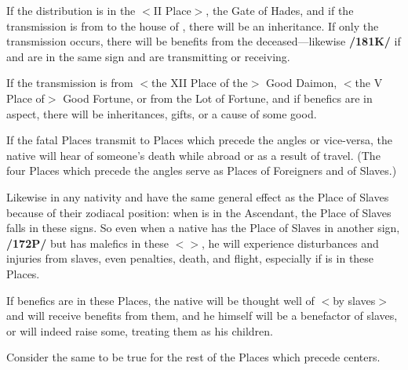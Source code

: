 If the distribution is in the $<$II Place$>$, the Gate of Hades, and if the transmission is from \Saturn\xspace to the house of \Jupiter, there will be an inheritance. If only
the transmission occurs, there will be benefits from the deceased—likewise \textbf{/181K/} if \Saturn\xspace and \Jupiter\xspace are in the same sign and are transmitting or receiving.

If the transmission is from $<$the XII Place of the$>$ Good Daimon, $<$the V Place of$>$ Good Fortune, or from the Lot of Fortune, and if benefics are in aspect, there will be inheritances, gifts, or a cause of some good. 

If the fatal Places transmit to Places which precede the angles or vice-versa, the native will hear of someone’s death while abroad or as a result of travel. (The four Places which precede the angles serve as Places of Foreigners and of Slaves.)

 Likewise in any nativity \Gemini\xspace and \Sagittarius\xspace have the same general effect as the Place of Slaves because of their zodiacal position: when \Cancer\xspace is in the Ascendant, the Place of Slaves falls in these signs. So even when a native has the Place of Slaves in another sign, \textbf{/172P/} but has malefics in these $<$\Gemini\xspace [or] \Sagittarius$>$, he will experience disturbances and injuries from slaves, even penalties, death, and flight, especially if \Saturn\xspace is in these Places. 
 
 If benefics are in these Places, the native will be thought well of $<$by slaves$>$ and will receive benefits from them, and he himself will be a benefactor of slaves, or will indeed raise some, treating them as his children.
 
Consider the same to be true for the rest of the Places which precede centers.

\newpage